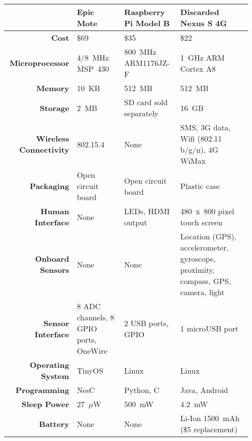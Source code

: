 \renewcommand{\arraystretch}{1.2}
\begin{table*}[t]
\begin{threeparttable}
{\scriptsize
\begin{tabularx}{\textwidth}{rXXX}

&
\multicolumn{1}{l}{\textbf{Epic Mote}} &
\multicolumn{1}{l}{\textbf{Raspberry Pi Model B}} &
\multicolumn{1}{l}{\textbf{Discarded Nexus S 4G}} \\ \toprule

\textbf{Cost} &
\$69 &
\$35 &
\$22\tnote{1} \\ \midrule

\textbf{Microprocessor} &
4/8~MHz MSP~430 &
800~MHz\tnote{2} ARM1176JZ-F &
1~GHz\tnote{2} ARM Cortex A8 \\

\textbf{Memory} &
10~KB &
512~MB &
512~MB \\

\textbf{Storage} &
2~MB &
SD card sold separately\tnote{3} &
16~GB \\ \midrule

\textbf{Wireless Connectivity} &
802.15.4 &
None &
SMS, 3G data, Wifi (802.11 b/g/n), 4G WiMax \\ \midrule

\textbf{Packaging} &
Open circuit board &
Open circuit board &
Plastic case \\

\textbf{Human Interface} &
None &
LEDs, HDMI output &
480~x~800 pixel touch screen \\ \midrule

\textbf{Onboard Sensors} &
None &
None &
Location (GPS), accelerometer, gyroscope, proximity, compass, GPS, camera,
light \\

\textbf{Sensor Interface} &
8 ADC channels, 8 GPIO ports, OneWire &
2 USB ports, GPIO &
1 microUSB port \\ \midrule

\textbf{Operating System} &
TinyOS &
Linux &
Linux \\

\textbf{Programming} &
NesC &
Python, C &
Java, Android \\ \midrule


\textbf{Sleep Power} &
27~$\mu$W &
500~mW\tnote{4} &
4.2~mW \\

\textbf{Battery} &
None &
None &
Li-Ion 1500~mAh (\$5 replacement) \\ \midrule


\end{tabularx}}
\end{threeparttable}
\end{table*}
